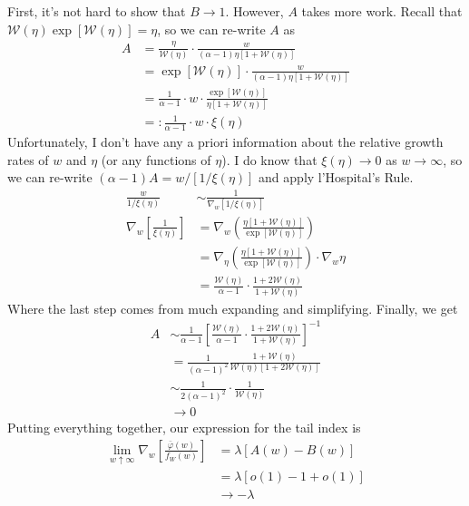 \documentclass{article}
\newcommand{\sW}{\mathscr{W}}
\begin{document}
First, it's not hard to show that $B \rightarrow 1$. However, $A$ takes more work. Recall that $\sW(\eta) \exp[\sW(\eta)] = \eta$, so we can re-write $A$ as
%
\begin{align}
    A &= \frac{\eta}{\sW(\eta)} \cdot \frac{w}{(\alpha - 1) \eta [1 + \sW(\eta)]}\\
    &= \exp[\sW(\eta)] \cdot \frac{w}{(\alpha - 1) \eta [1 + \sW(\eta)]}\\
    &= \frac{1}{\alpha - 1} \cdot w \cdot \frac{\exp[\sW(\eta)]}{\eta [1 + \sW(\eta)]}\\
    &=: \frac{1}{\alpha - 1} \cdot w \cdot \xi(\eta)
\end{align}
%
Unfortunately, I don't have any a priori information about the relative growth rates of $w$ and $\eta$ (or any functions of $\eta$). I do know that $\xi(\eta) \rightarrow 0$ as $w \rightarrow \infty$, so we can re-write $(\alpha - 1) A = w / [1 / \xi(\eta)]$ and apply l'Hospital's Rule.
%
\begin{align}
    \frac{w}{1 / \xi(\eta)} & \sim \frac{1}{\nabla_w [1 / \xi(\eta)]}\\
    \nabla_w \left[ \frac{1}{\xi(\eta)} \right] &= \nabla_w \left( \frac{\eta [ 1 + \sW(\eta)]}{\exp[\sW(\eta)]} \right)\\
    &= \nabla_\eta \left( \frac{\eta [ 1 + \sW(\eta)]}{\exp[\sW(\eta)]} \right) \cdot \nabla_w \eta\\
    &= \frac{\sW(\eta)}{\alpha - 1} \cdot \frac{1 + 2 \sW(\eta)}{1 + \sW(\eta)}
\end{align}
%
Where the last step comes from much expanding and simplifying. Finally, we get
%
\begin{align}
    A & \sim \frac{1}{\alpha - 1} \left[ \frac{\sW(\eta)}{\alpha - 1} \cdot \frac{1 + 2 \sW(\eta)}{1 + \sW(\eta)} \right]^{-1}\\
    & = \frac{1}{(\alpha - 1)^2} \frac{1 + \sW(\eta)}{\sW(\eta)[1 + 2 \sW(\eta)]}\\
    & \sim \frac{1}{2(\alpha - 1)^2} \cdot \frac{1}{\sW(\eta)}\\
    & \rightarrow 0
\end{align}
%
Putting everything together, our expression for the tail index is
%
\begin{align}
    \lim_{w \uparrow \infty} \nabla_w \left[ \frac{\bar{\varphi}(w)}{f_W(w)} \right] &= \lambda[A(w) - B(w)]\\
    &= \lambda[o(1) - 1 + o(1)]\\
    & \rightarrow -\lambda
\end{align}
\end{document}
